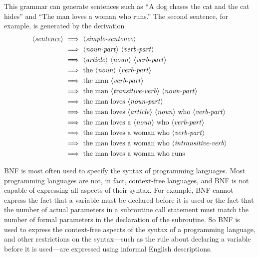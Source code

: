 \smallskip

\noindent This grammar can generate sentences such as ``A dog chases the cat and
the cat hides'' and ``The man loves a woman who runs.''
The second sentence, for example, is generated by the derivation
\begin{align*}
    \NT{sentence}\ &\YIELDS\ \NT{simple-sentence}\\
       &\YIELDS\ \NT{noun-part}\ \NT{verb-part}\\
       &\YIELDS\ \NT{article}\ \NT{noun}\ \NT{verb-part}\\
       &\YIELDS\ \mbox{the}\ \NT{noun}\ \NT{verb-part}\\
       &\YIELDS\ \mbox{the}\ \mbox{man}\ \NT{verb-part}\\
       &\YIELDS\ \mbox{the}\ \mbox{man}\ \NT{transitive-verb}\ \NT{noun-part}\\
       &\YIELDS\ \mbox{the}\ \mbox{man}\ \mbox{loves}\ \NT{noun-part}\\
       &\YIELDS\ \mbox{the}\ \mbox{man}\ \mbox{loves}\ \NT{article}
              \ \NT{noun}\ \mbox{who}\ \NT{verb-part}\\
       &\YIELDS\ \mbox{the}\ \mbox{man}\ \mbox{loves}\ \mbox{a}
              \ \NT{noun}\ \mbox{who}\ \NT{verb-part}\\
       &\YIELDS\ \mbox{the}\ \mbox{man}\ \mbox{loves}\ \mbox{a}
              \ \mbox{woman}\ \mbox{who}\ \NT{verb-part}\\
       &\YIELDS\ \mbox{the}\ \mbox{man}\ \mbox{loves}\ \mbox{a}
              \ \mbox{woman}\ \mbox{who}\ \NT{intransitive-verb}\\
       &\YIELDS\ \mbox{the}\ \mbox{man}\ \mbox{loves}\ \mbox{a}
              \ \mbox{woman}\ \mbox{who}\ \mbox{runs}
\end{align*}

\medskip

BNF is most often used to specify the syntax of programming languages.
Most programming languages are not, in fact, context-free languages, and
BNF is not capable of expressing all aspects of their syntax.
For example, BNF cannot express the fact that a variable must
be declared before it is used or the fact that the number of
actual parameters in a subroutine call statement must match the number
of formal parameters in the declaration of the subroutine.
So BNF is used to express the context-free aspects of the syntax
of a programming language, and other restrictions on the syntax---such
as the rule about declaring a variable before it is used---are expressed
using informal English descriptions.

